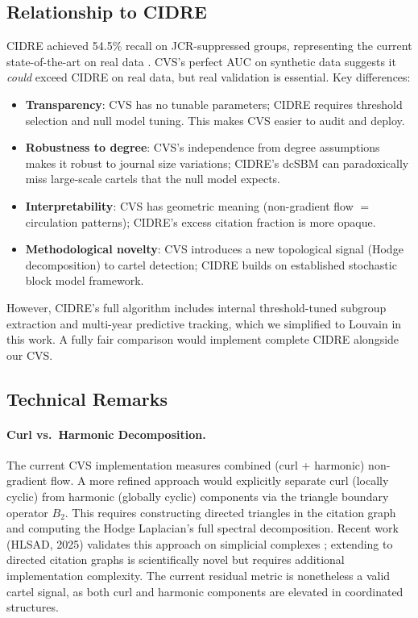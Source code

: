 \documentclass[11pt,letterpaper]{article}
\begin{document}
\subsection{Relationship to CIDRE}

CIDRE achieved 54.5\% recall on JCR-suppressed groups, representing the current state-of-the-art on real data \citep{Kojaku2021}. CVS's perfect AUC on synthetic data suggests it \emph{could} exceed CIDRE on real data, but real validation is essential. Key differences:

\begin{itemize}
  \item \textbf{Transparency}: CVS has no tunable parameters; CIDRE requires threshold selection and null model tuning. This makes CVS easier to audit and deploy.
  \item \textbf{Robustness to degree}: CVS's independence from degree assumptions makes it robust to journal size variations; CIDRE's dcSBM can paradoxically miss large-scale cartels that the null model expects.
  \item \textbf{Interpretability}: CVS has geometric meaning (non-gradient flow $=$ circulation patterns); CIDRE's excess citation fraction is more opaque.
  \item \textbf{Methodological novelty}: CVS introduces a new topological signal (Hodge decomposition) to cartel detection; CIDRE builds on established stochastic block model framework.
\end{itemize}

However, CIDRE's full algorithm includes internal threshold-tuned subgroup extraction and multi-year predictive tracking, which we simplified to Louvain in this work. A fully fair comparison would implement complete CIDRE alongside our CVS.

\subsection{Technical Remarks}

\paragraph{Curl vs.\ Harmonic Decomposition.}
The current CVS implementation measures combined (curl + harmonic) non-gradient flow. A more refined approach would explicitly separate curl (locally cyclic) from harmonic (globally cyclic) components via the triangle boundary operator $B_2$. This requires constructing directed triangles in the citation graph and computing the Hodge Laplacian's full spectral decomposition. Recent work (HLSAD, 2025) validates this approach on simplicial complexes \citep{Frantzen2025}; extending to directed citation graphs is scientifically novel but requires additional implementation complexity. The current residual metric is nonetheless a valid cartel signal, as both curl and harmonic components are elevated in coordinated structures.
\end{document}
